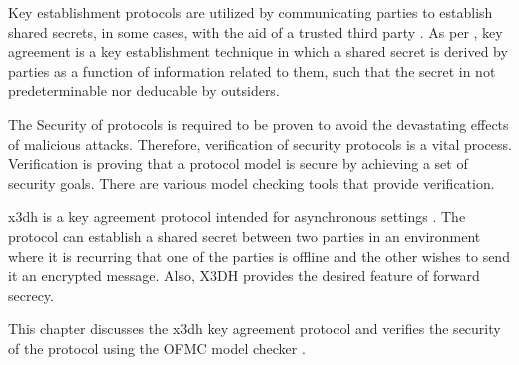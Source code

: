 
Key establishment protocols are utilized by communicating parties to establish shared secrets, in some cases, with the aid of a trusted third party \cite{handbookOfAppliedCrypto}. As per \cite{handbookOfAppliedCrypto}, key agreement is a key establishment technique in which a shared secret is derived by parties as a function of information related to them, such that the secret in not predeterminable nor deducable by outsiders.
\par
The Security of protocols is required to be proven to avoid the devastating effects of malicious attacks. Therefore, verification of security protocols is a vital process. Verification is proving that a protocol model is secure by achieving a set of security goals. There are various model checking tools that provide verification.
\par
\gls{x3dh} is a key agreement protocol intended for asynchronous settings \cite{x3dh}. The protocol can establish a shared secret between two parties in an environment where it is recurring that one of the parties is offline and the other wishes to send it an encrypted message. Also, X3DH provides the desired feature of forward secrecy. 
\par
This chapter discusses the \gls{x3dh} key agreement protocol \cite{x3dh} and verifies the security of the protocol using the OFMC model checker \cite{ofmc}.